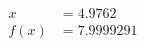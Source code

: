 \documentclass[preview]{standalone}
\begin{document}
\begin{align*}
x &= 4.9762\\f(x) &= 7.9999291
\end{align*}
\end{document}
